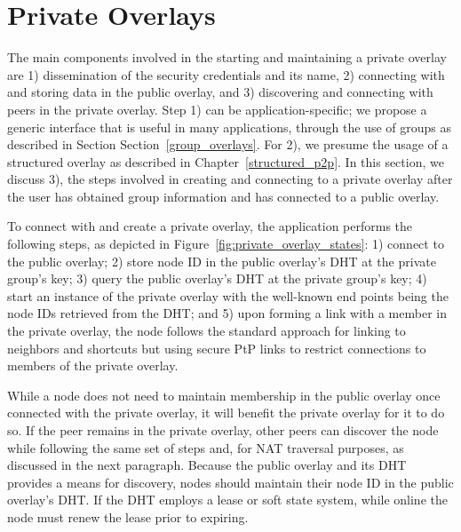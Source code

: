 \section{Private Overlays}
\label{private_overlays}
The main components involved in the starting and maintaining a private overlay
are 1) dissemination of the security credentials and its name, 2) connecting
with and storing data in the public overlay, and 3) discovering and connecting
with peers in the private overlay.  Step 1) can be application-specific; we
propose a generic interface that is useful in many applications, through the
use of groups as described in Section Section~\ref{group_overlays}.  For 2),
we presume the usage of a structured overlay as described in
Chapter~\ref{structured_p2p}.  In this section, we discuss 3), the steps
involved in creating and connecting to a private overlay after the user has
obtained group information and has connected to a public overlay.

To connect with and create a private overlay, the application performs the
following steps, as depicted in Figure~\ref{fig:private_overlay_states}: 1)
connect to the public overlay; 2) store node ID in the public overlay's DHT at
the private group's key; 3) query the public overlay's DHT at the private
group's key; 4) start an instance of the private overlay with the well-known
end points being the node IDs retrieved from the DHT; and 5) upon forming a
link with a member in the private overlay, the node follows the standard
approach for linking to neighbors and shortcuts but using secure PtP links to
restrict connections to members of the private overlay.

While a node does not need to maintain membership in the public overlay once
connected with the private overlay, it will benefit the private overlay for it
to do so.  If the peer remains in the private overlay, other peers can discover
the node while following the same set of steps and, for NAT traversal purposes,
as discussed in the next paragraph.  Because the public overlay and its DHT
provides a means for discovery, nodes should maintain their node ID in the public
overlay's DHT.  If the DHT employs a lease or soft state system, while online
the node must renew the lease prior to expiring.

